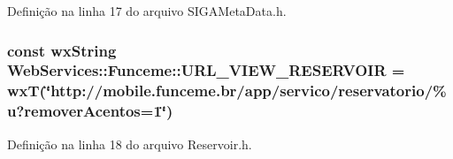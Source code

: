 Definição na linha 17 do arquivo S\+I\+G\+A\+Meta\+Data.\+h.

\subsubsection[{U\+R\+L\+\_\+\+V\+I\+E\+W\+\_\+\+R\+E\+S\+E\+R\+V\+O\+IR}]{\setlength{\rightskip}{0pt plus 5cm}const wx\+String Web\+Services\+::\+Funceme\+::\+U\+R\+L\+\_\+\+V\+I\+E\+W\+\_\+\+R\+E\+S\+E\+R\+V\+O\+IR = wxT(\char`\"{}http\+://mobile.\+funceme.\+br/app/servico/reservatorio/\%u?remover\+Acentos=1\char`\"{})}\label{namespace_web_services_1_1_funceme_a4f1626c9fef0fae4195a63d6271ede1c}


Definição na linha 18 do arquivo Reservoir.\+h.

